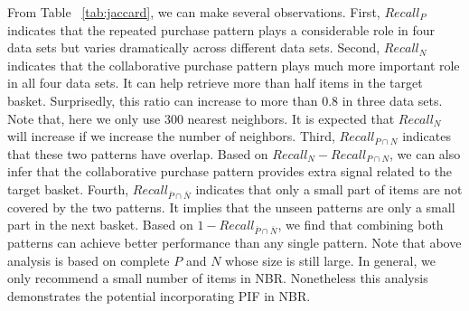 \documentclass[sigconf]{acmart}
\begin{document}
From Table  ~\ref{tab:jaccard}, we can make several observations. First, $Recall_P$ indicates that the repeated purchase pattern plays a considerable role in four data sets but varies dramatically across different data sets. Second, $Recall_N$ indicates that the collaborative purchase pattern plays much more  important role in all four data sets. It can help retrieve more than half items in the target basket. Surprisedly, this ratio can increase to more than 0.8 in three data sets. Note that, here we only use 300 nearest neighbors. It is expected that  $Recall_N$ will increase if we increase the number of neighbors. Third, $Recall_{P\cap N}$ indicates that these two patterns have overlap. Based on $Recall_N-Recall_{P\cap N}$, we can also infer that the collaborative purchase pattern provides extra signal related to the target basket. Fourth, $Recall_{\overline{P}\cap \overline{N}}$ indicates that only a small part of items are not covered by the two patterns. It implies that the  unseen patterns are  only a small part in the next basket.  Based on $1-Recall_{\overline{P}\cap \overline{N}}$, we find  that combining both patterns can achieve  better performance than any single pattern. Note that above analysis is based on complete $P$ and $N$ whose size is still large. In general, we only recommend a small number of items in NBR. Nonetheless this analysis demonstrates the  potential incorporating  PIF in NBR. 
\end{document}
